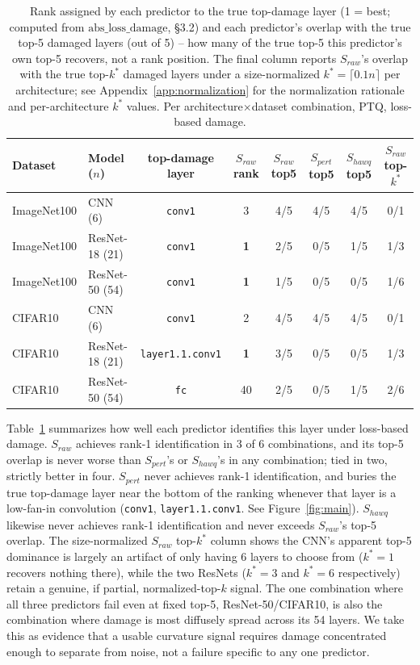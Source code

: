 \documentclass{article}
\begin{document}
\begin{table}[t]
\centering
\caption{Rank assigned by each predictor to the true top-damage layer (1 = best; computed from $\mathrm{abs\_loss\_damage}$, \S3.2) and each predictor's overlap with the true top-5 damaged layers (out of 5) -- how many of the true top-5 this predictor's own top-5 recovers, not a rank position. The final column reports $S_{raw}$'s overlap with the true top-$k^*$ damaged layers under a size-normalized $k^*=\lceil 0.1n\rceil$ per architecture; see Appendix~\ref{app:normalization} for the normalization rationale and per-architecture $k^*$ values. Per architecture$\times$dataset combination, PTQ, loss-based damage.}
\label{tab:rank}
\small
\renewcommand{\arraystretch}{0.92}
\begin{tabular}{llcccccc}
\toprule
Dataset & Model ($n$) & top-damage layer & $S_{raw}$ rank & $S_{raw}$ top5 & $S_{pert}$ top5 & $S_{hawq}$ top5 & $S_{raw}$ top-$k^*$ \\
\midrule
ImageNet100 & CNN (6)        & \texttt{conv1}         & 3  & 4/5 & 4/5 & 4/5 & 0/1 \\
ImageNet100 & ResNet-18 (21) & \texttt{conv1}         & \textbf{1} & 2/5 & 0/5 & 1/5 & 1/3 \\
ImageNet100 & ResNet-50 (54) & \texttt{conv1}         & \textbf{1} & 1/5 & 0/5 & 0/5 & 1/6 \\
CIFAR10     & CNN (6)        & \texttt{conv1}         & 2  & 4/5 & 4/5 & 4/5 & 0/1 \\
CIFAR10     & ResNet-18 (21) & \texttt{layer1.1.conv1}& \textbf{1} & 3/5 & 0/5 & 0/5 & 1/3 \\
CIFAR10     & ResNet-50 (54) & \texttt{fc}            & 40 & 2/5 & 0/5 & 1/5 & 2/6 \\
\bottomrule
\end{tabular}
\end{table}

Table~\ref{tab:rank} summarizes how well each predictor identifies this layer under loss-based damage. $S_{raw}$ achieves rank-1 identification in 3 of 6 combinations, and its top-5 overlap is never worse than $S_{pert}$'s or $S_{hawq}$'s in any combination; tied in two, strictly better in four. $S_{pert}$ never achieves rank-1 identification, and buries the true top-damage layer near the bottom of the ranking whenever that layer is a low-fan-in convolution (\texttt{conv1}, \texttt{layer1.1.conv1}. See Figure~\ref{fig:main}). $S_{hawq}$ likewise never achieves rank-1 identification and never exceeds $S_{raw}$'s top-5 overlap. The size-normalized $S_{raw}$ top-$k^*$ column shows the CNN's apparent top-5 dominance is largely an artifact of only having 6 layers to choose from ($k^*=1$ recovers nothing there), while the two ResNets ($k^*=3$ and $k^*=6$ respectively) retain a genuine, if partial, normalized-top-$k$ signal. The one combination where all three predictors fail even at fixed top-5, ResNet-50/CIFAR10, is also the combination where damage is most diffusely spread across its 54 layers. We take this as evidence that a usable curvature signal requires damage concentrated enough to separate from noise, not a failure specific to any one predictor.
\end{document}
